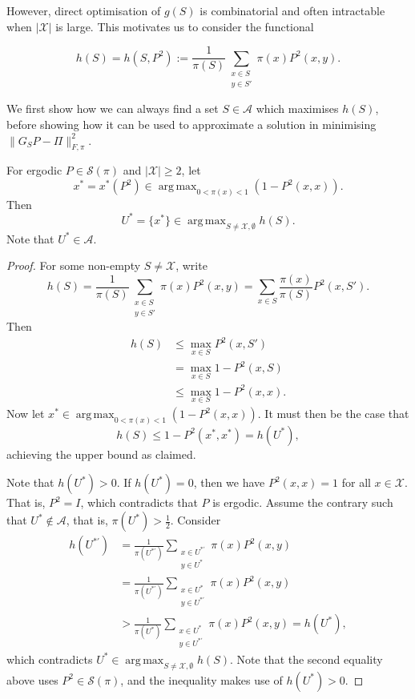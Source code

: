 \documentclass[EJP]{ejpecp} %
\DeclareMathOperator*{\argmax}{arg\,max}
\begin{document}
However, direct optimisation of $g(S)$ is combinatorial and often intractable when $|\mathcal{X}|$ is large. This motivates us to consider the functional 

\begin{equation}\label{eq:h(S)}
    h(S) = h(S,P^2) := \frac{1}{\pi(S)} \sum_{\substack{x \in S\\ y \in S'}} \pi(x)P^2(x,y).
\end{equation}

We first show how we can always find a set $S \in \mathcal{A}$ which maximises $h(S)$, before showing how it can be used to approximate a solution in minimising $\|G_S P - \Pi\|_{F, \pi}^2$.

\begin{proposition} \label{prop:x* optimal}
    For ergodic $P \in \mathcal{S}(\pi)$ and $|\mathcal{X}| \geq 2$, let 
    $$x^* = x^*(P^2) \in \argmax_{0 < \pi(x) < 1} \left(1-P^2(x,x)\right).$$
    Then 
    $$U^* = \{x^*\} \in \argmax_{S \neq \mathcal{X}, \emptyset} h(S).$$
    Note that $U^* \in \mathcal{A}$.
\end{proposition}

\begin{proof}
    For some non-empty $S \neq \mathcal{X}$, write 
    $$h(S) = \frac{1}{\pi(S)} \sum_{\substack{x \in S\\ y \in S'}} \pi(x)P^2(x,y) = \sum_{x \in S} \frac{\pi(x)}{\pi(S)} P^2(x,S').$$
    Then 
    \begin{align*}
        h(S) &\leq \max_{x \in S} P^2(x, S')\\
        &= \max_{x \in S} 1-P^2(x,S) \\
        &\leq \max_{x \in S} 1 - P^2(x,x).
    \end{align*}
    Now let $x^* \in \argmax_{0 < \pi(x) < 1} \left(1-P^2(x,x)\right).$ It must then be the case that 
    $$h(S) \leq 1 - P^2(x^*, x^*) = h(U^*),$$
    achieving the upper bound as claimed.
    
    Note that $h(U^*) > 0$. If $h(U^*) = 0$, then we have $P^2(x,x) = 1$ for all $x \in \mathcal{X}$. That is, $P^2 = I$, which contradicts that $P$ is ergodic.
    Assume the contrary such that $U^* \notin \mathcal{A}$, that is, $\pi(U^*) > \frac{1}{2}$. Consider
    \begin{align*}
        h(U^{*\prime}) &= \frac{1}{\pi(U^{*'})} \sum_{\substack{x \in U^{*'}\\ y \in U^{*}}} \pi(x)P^2(x,y) \\
        &= \frac{1}{\pi(U^{*'})} \sum_{\substack{x \in U^{*}\\ y \in U^{*'}}} \pi(x)P^2(x,y) \\
        &> \frac{1}{\pi(U^{*})} \sum_{\substack{x \in U^{*}\\ y \in U^{*'}}} \pi(x)P^2(x,y) = h(U^*),
    \end{align*}
    which contradicts $U^* \in \argmax_{S \neq \mathcal{X}, \emptyset} h(S)$. Note that the second equality above uses $P^2 \in \mathcal{S}(\pi)$, and the inequality makes use of $h(U^*) > 0$. 

\end{proof}
\end{document}
